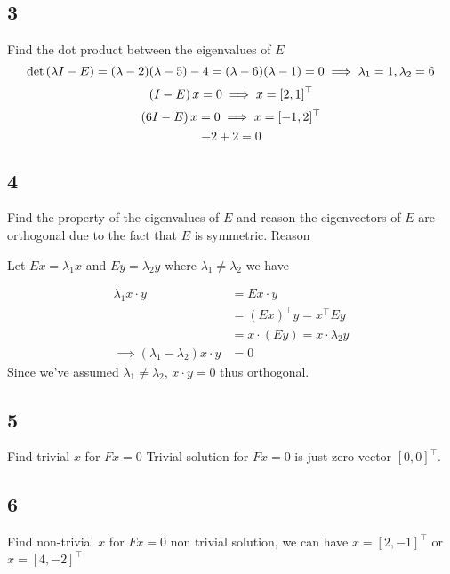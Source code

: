\documentclass{article}
\begin{document}
\subsection*{3}
\begin{myleftlinebox}
    Find the dot product between the eigenvalues of \(E\)
    \tcblower
    \[
        \det\left( \lambda I-E  \right) = (\lambda-2)(\lambda -5)-4 = (\lambda-6)(\lambda-1)=0\implies \lambda_1 = 1,\lambda_2=6
    \]
    \[
        \left( I-E  \right)x = 0 \implies x = [2,1]^\top
    \]
    \[
        \left( 6I-E  \right)x = 0 \implies x = [-1,2]^\top
    \]
    \[
        -2+2=0
    \]
\end{myleftlinebox}


\subsection*{4}
\begin{myleftlinebox}
    Find the property of the eigenvalues of \(E\) and reason
    \tcblower
    the eigenvectors of \(E\) are orthogonal due to the fact that \(E\) is symmetric. Reason

    Let \(Ex = \lambda_1 x\) and \(Ey = \lambda_2 y\) where \(\lambda_1\neq \lambda_2\) we have

    \begin{equation}\label{eqn:symM_eig_Ortho}
        \begin{split}
            \lambda_1 x\cdot y & = Ex \cdot y\\
            &= (Ex)^\top y = x^\top Ey \\
            & = x\cdot (Ey) = x\cdot \lambda_2 y\\
            \implies (\lambda_1 - \lambda_2)x\cdot y &= 0
        \end{split}
    \end{equation}
    Since we've assumed \(\lambda_1\neq \lambda_2\), \(x\cdot y=0\) thus orthogonal.

\end{myleftlinebox}

\subsection*{5}
\begin{myleftlinebox}
    Find trivial \(x\) for \(Fx=0\)
    \tcblower
    Trivial solution for \(Fx=0\) is just zero vector \([0,0]^\top\).
\end{myleftlinebox}


\subsection*{6}
\begin{myleftlinebox}
    Find non-trivial \(x\) for \(Fx=0\)
    \tcblower
    non trivial solution, we can have \(x=[2,-1]^\top\) or  \(x=[4,-2]^\top\)
\end{myleftlinebox}
\end{document}
